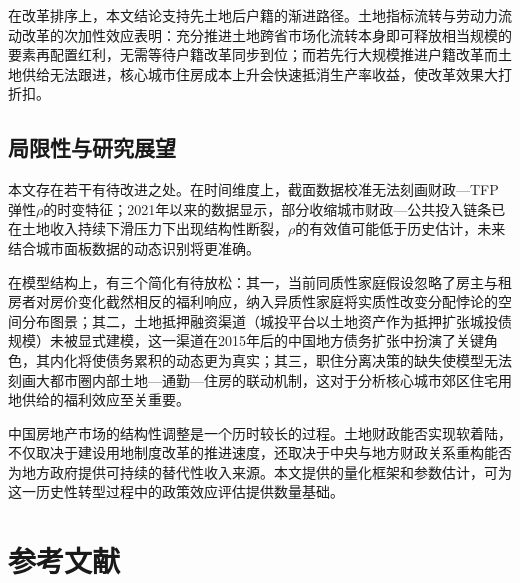 \documentclass[UTF8,a4paper,12pt]{ctexart}
\theoremstyle{plain}
\theoremstyle{definition}
\theoremstyle{remark}
\begin{document}
在改革排序上，本文结论支持先土地后户籍的渐进路径。土地指标流转与劳动力流动改革的次加性效应表明：充分推进土地跨省市场化流转本身即可释放相当规模的要素再配置红利，无需等待户籍改革同步到位；而若先行大规模推进户籍改革而土地供给无法跟进，核心城市住房成本上升会快速抵消生产率收益，使改革效果大打折扣。

\subsection{局限性与研究展望}

本文存在若干有待改进之处。在时间维度上，截面数据校准无法刻画财政—TFP弹性$\rho$的时变特征；2021年以来的数据显示，部分收缩城市财政—公共投入链条已在土地收入持续下滑压力下出现结构性断裂，$\rho$的有效值可能低于历史估计，未来结合城市面板数据的动态识别将更准确。

在模型结构上，有三个简化有待放松：其一，当前同质性家庭假设忽略了房主与租房者对房价变化截然相反的福利响应，纳入异质性家庭将实质性改变分配悖论的空间分布图景；其二，土地抵押融资渠道（城投平台以土地资产作为抵押扩张城投债规模）未被显式建模，这一渠道在2015年后的中国地方债务扩张中扮演了关键角色，其内化将使债务累积的动态更为真实；其三，职住分离决策的缺失使模型无法刻画大都市圈内部土地—通勤—住房的联动机制，这对于分析核心城市郊区住宅用地供给的福利效应至关重要。

中国房地产市场的结构性调整是一个历时较长的过程。土地财政能否实现软着陆，不仅取决于建设用地制度改革的推进速度，还取决于中央与地方财政关系重构能否为地方政府提供可持续的替代性收入来源。本文提供的量化框架和参数估计，可为这一历史性转型过程中的政策效应评估提供数量基础。

\section*{参考文献}
\end{document}
